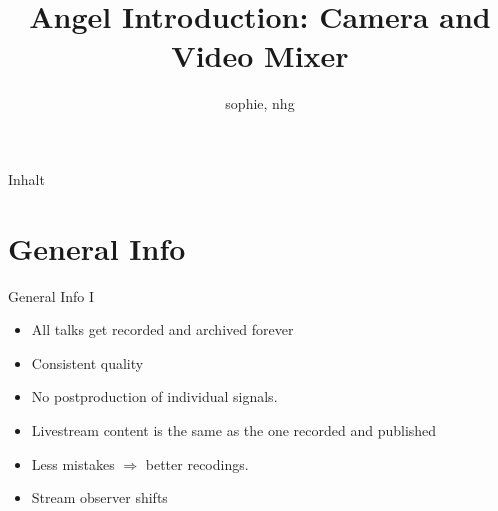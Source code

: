\documentclass[aspectratio=169]{beamer}
\title{Angel Introduction: Camera and Video Mixer}
\author{sophie, nhg}
\institute{Productiehuis and C3VOC}
\begin{document}

\maketitle

\begin{frame}{Inhalt}
\tableofcontents
\end{frame}


\newpage





\section{General Info}
\begin{frame}{General Info I}
	\begin{itemize}
		\item All talks get recorded and archived forever
		\item Consistent quality
		\item No postproduction of individual signals.
		\item Livestream content is the same as the one recorded and published
		\item Less mistakes $\Rightarrow$ better recodings.
		\item Stream observer shifts
	\end{itemize}
\end{frame}
\end{document}
